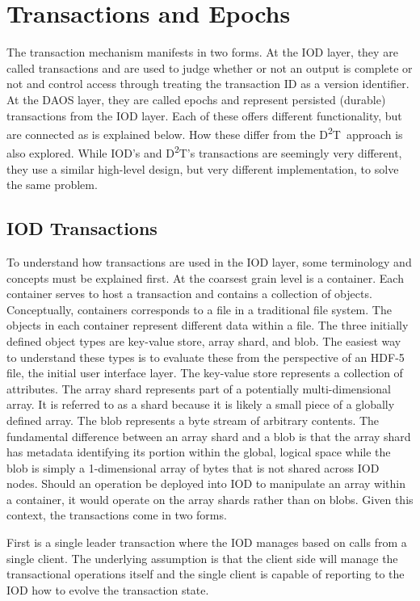 \documentclass[conference]{IEEEtran}
\newcommand{\DDT}{D\textsuperscript{2}T~}
\newcommand{\DDTns}{D\textsuperscript{2}T}
\begin{document}
\section{Transactions and Epochs}
\label{sec:transactions}

The transaction mechanism manifests in two forms. At the IOD layer, they are
called transactions and are used to judge whether or not an output is complete
or not and control access through treating the transaction ID as a version
identifier. At the DAOS layer, they are called epochs and represent persisted
(durable) transactions from the IOD layer. Each of these offers different
functionality, but are connected as is explained below. How these differ from
the \DDT approach is also explored. While IOD's and \DDTns's transactions are
seemingly very different, they use a similar high-level design, but very
different implementation, to solve the same problem.

\subsection{IOD Transactions}
To understand how transactions are used in the IOD layer, some terminology and
concepts must be explained first. At the coarsest grain level is a container.
Each container serves to host a transaction and contains a collection of
objects. Conceptually, containers corresponds to a file in a traditional file
system. The objects in each container represent different data within a file.
The three initially defined object types are key-value store, array shard,
and blob. The easiest way to understand these types is to evaluate these from
the perspective of an HDF-5 file, the initial user interface layer. The
key-value store represents a collection of attributes. The array shard
represents part of a potentially multi-dimensional array. It is referred to as
a shard because it is likely a small piece of a globally defined array. The
blob represents a byte stream of arbitrary contents.  The fundamental
difference between an array shard and a blob is that the array shard has
metadata identifying its portion within the global, logical space while the
blob is simply a 1-dimensional array of bytes that is not shared across IOD
nodes.  Should an operation be deployed into IOD to manipulate an array within
a container, it would operate on the array shards rather than on blobs. Given
this context, the transactions come in two forms.

First is a single leader transaction where the IOD manages based on calls from
a single client. The underlying assumption is that the client side will manage
the transactional operations itself and the single client is capable of
reporting to the IOD how to evolve the transaction state. 
\end{document}
